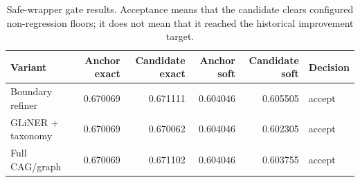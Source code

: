 \begin{table}[H]
\centering
\small
\caption{Safe-wrapper gate results. Acceptance means that the candidate clears configured non-regression floors; it does not mean that it reached the historical improvement target.}
\label{tab:gate-results}
\begin{tabular}{lrrrrl}
\toprule
Variant & Anchor exact & Candidate exact & Anchor soft & Candidate soft & Decision \\
\midrule
Boundary refiner & 0.670069 & 0.671111 & 0.604046 & 0.605505 & accept \\
GLiNER + taxonomy & 0.670069 & 0.670062 & 0.604046 & 0.602305 & accept \\
Full CAG/graph & 0.670069 & 0.671102 & 0.604046 & 0.603755 & accept \\
\bottomrule
\end{tabular}
\end{table}
